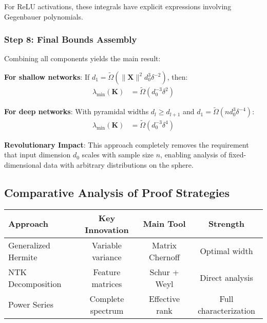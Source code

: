 \documentclass{article}
\begin{document}
For ReLU activations, these integrals have explicit expressions involving Gegenbauer polynomials.

\subsubsection{Step 8: Final Bounds Assembly}

Combining all components yields the main result:

\textbf{For shallow networks}: If $d_1 = \tilde{\Omega}(\|\mathbf{X}\|^2 d_0^3 \delta^{-2})$, then:
\begin{align}
    \lambda_{\min}(\mathbf{K}) &= \tilde{\Omega}(d_0^{-3}\delta^2)
\end{align}

\textbf{For deep networks}: With pyramidal widths $d_l \geq d_{l+1}$ and $d_1 = \tilde{\Omega}(n d_0^3 \delta^{-4})$:
\begin{align}
    \lambda_{\min}(\mathbf{K}) &= \tilde{\Omega}(d_0^{-3}\delta^4)
\end{align}

\textbf{Revolutionary Impact}: This approach completely removes the requirement that input dimension $d_0$ scales with sample size $n$, enabling analysis of fixed-dimensional data with arbitrary distributions on the sphere.

\subsection{Comparative Analysis of Proof Strategies}

\begin{table}[h]
\centering
\begin{tabular}{|l|c|c|c|}
\hline
\textbf{Approach} & \textbf{Key Innovation} & \textbf{Main Tool} & \textbf{Strength} \\
\hline
Generalized Hermite & Variable variance & Matrix Chernoff & Optimal width \\
\hline
NTK Decomposition & Feature matrices & Schur + Weyl & Direct analysis \\
\hline
Power Series & Complete spectrum & Effective rank & Full characterization \\
\hline
\end{tabular}
\end{table}
\end{document}

